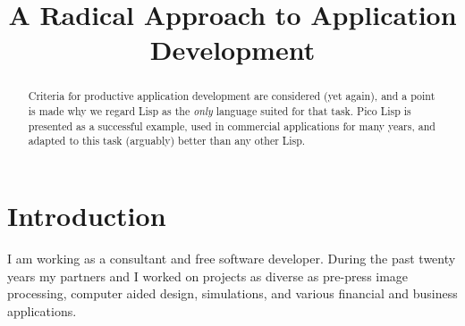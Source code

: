 \title{A Radical Approach to Application Development}

\maketitle









% 



\begin{abstract}
Criteria for productive application development are considered (yet again), and
a point is made why we regard Lisp as the \emph{only} language suited for that
task. Pico Lisp is presented as a successful example, used in commercial
applications for many years, and adapted to this task (arguably) better than any
other Lisp.
\end{abstract}

\section{Introduction}
\label{sec:rad-introduction}

I am working as a consultant and free software developer. During the past twenty
years my partners and I worked on projects as diverse as pre-press image
processing, computer aided design, simulations, and various financial and
business applications. 

